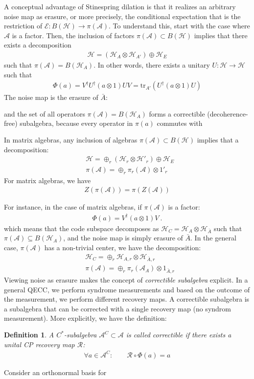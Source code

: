 \documentclass[11pt]{article}
\newcommand{\mH}{\mathcal{H}}
\newcommand{\mA}{\mathcal{A}}
\newcommand{\mE}{\mathcal{E}}
\newcommand{\mR}{\mathcal{R}}
\newcommand{\nn}{\nonumber}
\newtheorem{definition}{Definition}
\begin{document}
A conceptual advantage of Stinespring dilation is that it realizes an arbitrary noise map as erasure, or more precisely, the conditional expectation that is the restriction of $\mE:B(\mH)\to \pi(\mA)$. To understand this, start with the case where $\mA$ is a factor. Then, the inclusion of factors $\pi(\mA)\subset B(\mH)$ implies that there exists a decomposition 
\begin{align}
    \mH=(\mH_A\otimes \mH_{A'})\oplus \mH_E
\end{align}
such that $\pi(\mA)=B(\mH_A)$. In other words, there exists a unitary $U:\mH\to \mH$ such that 
\begin{align}
\Phi(a)=V^\dagger U^\dagger (a\otimes 1)U V=\text{tr}_{A'}(U^\dagger (a\otimes 1) U)
\end{align}
The noise map is the erasure of $\bar{A}$:

and the set of all operators $\pi(\mA)=B(\mH_A)$ forms a correctible (decoherence-free) subalgebra, because every operator in $\pi(a)$ commutes with 

In matrix algebras, any inclusion of algebras $\pi(\mA)\subset B(\mH)$ implies that a decomposition:
\begin{align}
    &\mH=\oplus_r (\mH_r\otimes \mH'_r)\oplus \mH_E\nn\\
    &\pi(\mA)=\oplus_r \pi_r(\mA)\otimes 1'_{r}
\end{align}
For matrix algebras, we have
\begin{align}
    Z(\pi(\mA))=\pi(Z(\mA))
\end{align}

For instance, in the case of matrix algebras, if $\pi(\mA)$ is a factor:
\begin{align}
    \Phi(a)=V^\dagger (a\otimes 1) V\ .
\end{align}
which means that the code subspace decomposes as $\mH_C=\mH_A\otimes \mH_{\bar{A}}$ such that $\pi(\mA)\subseteq B(\mH_A)$, and the noise map is simply erasure of $\bar{A}$. In the general case, $\pi(\mA)$ has a non-trivial center, we have the decomposition:
\begin{align}
&\mH_C=\oplus_r \mH_{A,r}\otimes \mH_{\bar{A},r}\nn\\
&\pi(\mA)=\oplus_r \pi_r(\mA_A)\otimes 1_{\bar{A},r}
\end{align}
Viewing noise as erasure makes the concept of {\it correctible subalgebra} explicit. In a general QECC, we perform syndrome measurements and based on the outcome of the measurement, we perform different recovery maps. A correctible subalgebra is a subalgebra that can be corrected with a single recovery map (no syndrom measurement). More explicitly, we have the definition:
\begin{definition}
A $C^*$-subalgebra $\mA^C\subset \mA$ is called {\it correctible} if there exists a unital CP recovery map $\mathcal{R}$:
\begin{align}
    \forall a\in \mA^C:\qquad \mR\circ \Phi(a)=a
\end{align}
\end{definition}
Consider an orthonormal basis for 
\end{document}
